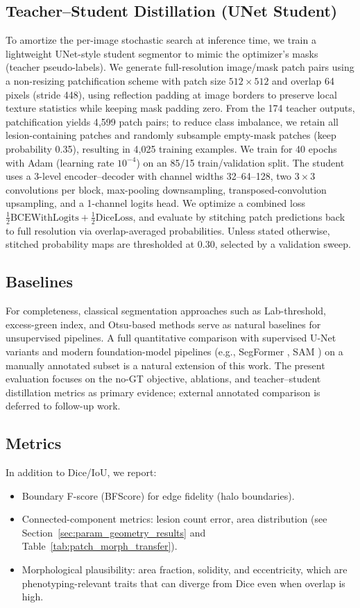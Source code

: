 \documentclass[journal]{IEEEtran}
\begin{document}
\subsection{Teacher--Student Distillation (UNet Student)}
To amortize the per-image stochastic search at inference time, we train a lightweight UNet-style student segmentor to mimic the optimizer's masks (teacher pseudo-labels).
We generate full-resolution image/mask patch pairs using a non-resizing patchification scheme with patch size $512\times512$ and overlap 64 pixels (stride 448), using reflection padding at image borders to preserve local texture statistics while keeping mask padding zero.
From the 174 teacher outputs, patchification yields 4{,}599 patch pairs; to reduce class imbalance, we retain all lesion-containing patches and randomly subsample empty-mask patches (keep probability 0.35), resulting in 4{,}025 training examples.
We train for 40 epochs with Adam (learning rate $10^{-4}$) on an 85/15 train/validation split.
The student uses a 3-level encoder--decoder with channel widths 32--64--128, two $3\times3$ convolutions per block, max-pooling downsampling, transposed-convolution upsampling, and a 1-channel logits head.
We optimize a combined loss $\tfrac12\mathrm{BCEWithLogits} + \tfrac12\mathrm{DiceLoss}$, and evaluate by stitching patch predictions back to full resolution via overlap-averaged probabilities. Unless stated otherwise, stitched probability maps are thresholded at 0.30, selected by a validation sweep.

\subsection{Baselines}
For completeness, classical segmentation approaches such as Lab-threshold, excess-green index, and Otsu-based methods serve as natural baselines for unsupervised pipelines. A full quantitative comparison with supervised U-Net variants \cite{ronneberger2015u} and modern foundation-model pipelines (e.g., SegFormer \cite{xie2021segformer}, SAM \cite{kirillov2023segment}) on a manually annotated subset is a natural extension of this work. The present evaluation focuses on the no-GT objective, ablations, and teacher--student distillation metrics as primary evidence; external annotated comparison is deferred to follow-up work.

\subsection{Metrics}
In addition to Dice/IoU, we report:
\begin{itemize}
    \item Boundary F-score (BFScore) for edge fidelity (halo boundaries).
    \item Connected-component metrics: lesion count error, area distribution (see Section~\ref{sec:param_geometry_results} and Table~\ref{tab:patch_morph_transfer}).
    \item Morphological plausibility: area fraction, solidity, and eccentricity, which are phenotyping-relevant traits that can diverge from Dice even when overlap is high.
\end{itemize}
\end{document}
